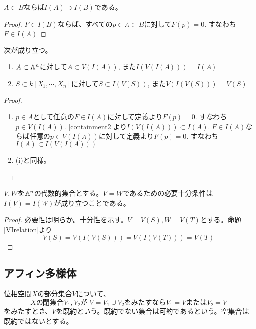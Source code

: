 \documentclass{ltjsreport}
\begin{document}
\begin{prop}\label{containment2}
  $A\subset B$ならば$I(A)\supset I(B)$である。
\end{prop}

\begin{proof}
  $F\in I(B)$ならば、すべての$p\in A\subset B$に対して$F(p)=0$. すなわち$F\in I(A)$
\end{proof}

\begin{prop}\label{VIrelation}
  次が成り立つ。
  \begin{enumerate}
    \item $A\subset \mathbb{A}^n$に対して$A\subset V(I(A))$, また$I(V(I(A)))=I(A)$
    \item $S\subset k[X_1,\cdots,X_n]$に対して$S\subset I(V(S))$, また$V(I(V(S)))=V(S)$
  \end{enumerate}
\end{prop}

\begin{proof}
  \begin{enumerate}
    \item $p\in A$として任意の$F\in I(A)$に対して定義より$F(p)=0$. すなわち$p\in V(I(A))$. \ref{containment2}より$I(V(I(A)))\subset I(A)$. $F\in I(A)$ならば任意の$p\in V(I(A))$に対して定義より$F(p)=0$. すなわち$I(A)\subset I(V(I(A)))$
    \item (i)と同様。
  \end{enumerate}
\end{proof}

\begin{prop}
  $V,W$を$\mathbb{A}^n$の代数的集合とする。$V=W$であるための必要十分条件は$I(V)=I(W)$が成り立つことである。
\end{prop}

\begin{proof}
  必要性は明らか。十分性を示す。$V=V(S), W=V(T)$とする。命題\ref{VIrelation}より
  \[
  V(S)=V(I(V(S)))=V(I(V(T)))=V(T)
  \]
\end{proof}





\subsection{アフィン多様体}

\begin{defin}
  位相空間$X$の部分集合$V$について、
  \[
  \text{$X$の閉集合$V_1,V_2$が }V=V_1\cup V_2\text{をみたすなら$V_1=V$または$V_2=V$}  
  \]
  をみたすとき、$V$を既約という。既約でない集合は可約であるという。空集合は既約ではないとする。
\end{defin}
\end{document}
